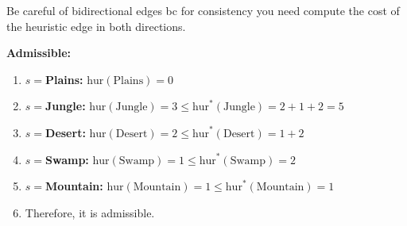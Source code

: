 \begin{warning}
    Be careful of bidirectional edges bc for consistency you need compute the cost of the heuristic edge in both directions.
\end{warning}
\newpage

\begin{example}

    \textbf{Admissible:}
    \begin{enumerate}
        \item \textbf{$s=$Plains:} $\text{hur}(\text{Plains}) = 0$ 
        \item \textbf{$s=$Jungle:} $\text{hur}(\text{Jungle}) = 3 \leq \text{hur}^*(\text{Jungle}) = 2 + 1 + 2 = 5$
        \item \textbf{$s=$Desert:} $\text{hur}(\text{Desert}) = 2 \leq \text{hur}^*(\text{Desert}) = 1 + 2$
        \item \textbf{$s=$Swamp:} $\text{hur}(\text{Swamp}) = 1 \leq \text{hur}^*(\text{Swamp}) = 2$
        \item \textbf{$s=$Mountain:} $\text{hur}(\text{Mountain}) = 1 \leq \text{hur}^*(\text{Mountain}) = 1$
        \item Therefore, it is admissible.
    \end{enumerate}
    \vspace{1em}


\end{example}
